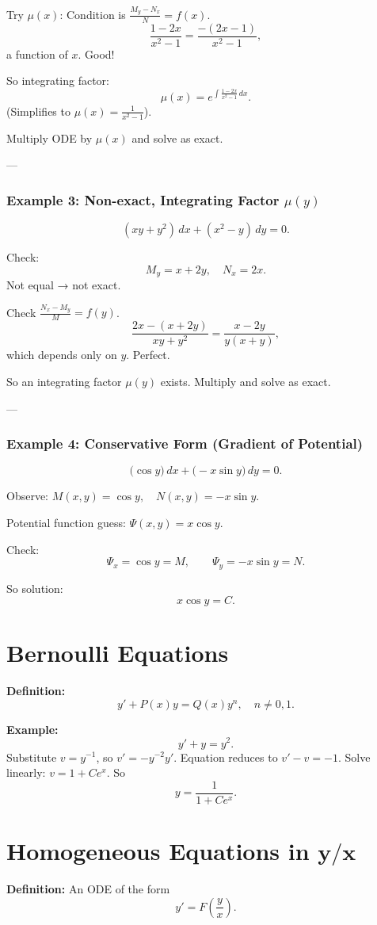 \documentclass[12pt]{book}
\begin{document}
Try $\mu(x)$: Condition is $\tfrac{M_y - N_x}{N} = f(x)$.  
\[
\frac{1 - 2x}{x^2 - 1} = \frac{- (2x-1)}{x^2-1},
\]
a function of $x$. Good!  

So integrating factor:
\[
\mu(x) = e^{\int \frac{1-2x}{x^2-1}\,dx}.
\]
(Simplifies to $\mu(x)=\tfrac{1}{x^2-1}$).  

Multiply ODE by $\mu(x)$ and solve as exact.

---

\subsection*{Example 3: Non-exact, Integrating Factor $\mu(y)$}
\[
(xy + y^2)\,dx + (x^2 - y)\,dy = 0.
\]

Check:  
\[
M_y = x + 2y, \quad N_x = 2x.
\]
Not equal → not exact.  

Check $\tfrac{N_x - M_y}{M} = f(y)$.  
\[
\frac{2x - (x+2y)}{xy+y^2} = \frac{x-2y}{y(x+y)},
\]
which depends only on $y$. Perfect.  

So an integrating factor $\mu(y)$ exists. Multiply and solve as exact.

---

\subsection*{Example 4: Conservative Form (Gradient of Potential)}
\[
\bigl(\cos y\bigr)\,dx + \bigl(-x \sin y\bigr)\,dy = 0.
\]

Observe: $M(x,y) = \cos y, \quad N(x,y) = -x \sin y$.  

Potential function guess: $\Psi(x,y) = x \cos y$.  

Check:  
\[
\Psi_x = \cos y = M, \qquad \Psi_y = -x \sin y = N.
\]

So solution:
\[
\boxed{x \cos y = C}.
\]

\chapter{Bernoulli Equations}
\textbf{Definition:}
\[
y' + P(x)y = Q(x) y^n, \quad n \neq 0,1.
\]

\textbf{Example:}
\[
y' + y = y^2.
\]
Substitute \(v = y^{-1}\), so \(v' = -y^{-2}y'\). Equation reduces to
\(v' - v = -1\). Solve linearly: \(v = 1 + Ce^x\).  
So
\[
y = \frac{1}{1 + Ce^x}.
\]

\chapter{Homogeneous Equations in \(\mathbf{y/x}\)}
\textbf{Definition:} An ODE of the form
\[
y' = F\!\left(\frac{y}{x}\right).
\]
\end{document}
